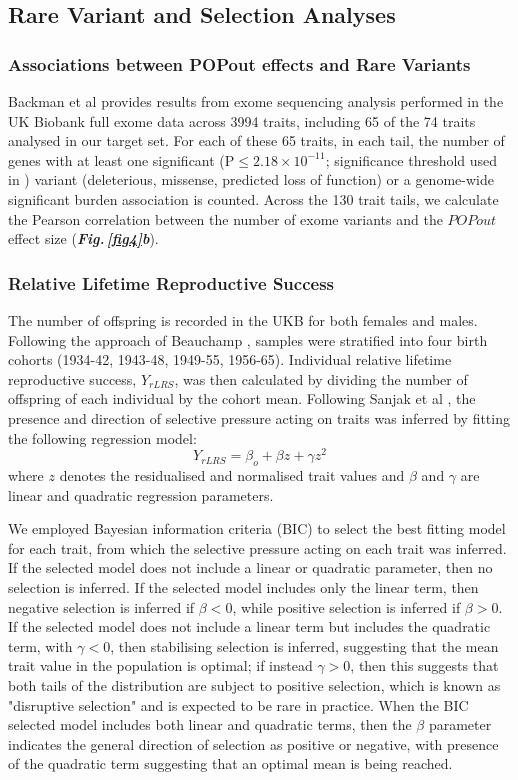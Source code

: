 \documentclass[12pt]{zHenriquesLab-StyleBioRxiv}
\newcommand\dref[2]{\normalsize{\textbf{\textit{Fig.\,\ref{#1}#2}}}\normalsize{}}
\begin{document}
\subsection*{Rare Variant and Selection Analyses} \label{sec:methods:rvs} 

\subsubsection*{Associations between POPout effects and Rare Variants}
Backman et al \cite{backman} provides results from exome sequencing analysis 
performed in the UK Biobank full exome data across 3994 traits, including 65 of 
the 74 traits analysed in our target set. For each of these 65 traits, in each tail, 
the number of genes with at least one significant (P$\le 2.18\times 10^{-11}$; significance 
threshold used in \cite{backman}) variant (deleterious, missense, predicted loss of function) or a 
genome-wide significant burden association is counted. Across the 130 trait tails, we 
calculate the Pearson correlation between the number of exome variants and the $POPout$ 
effect size (\dref{fig4}{b}). 
%
\subsubsection*{Relative Lifetime Reproductive Success}
The number of offspring is recorded in the UKB for both females and
males. Following the approach of Beauchamp \citep{v_select2}, samples were 
stratified into four birth cohorts (1934-42, 1943-48, 1949-55, 1956-65). Individual relative
lifetime reproductive success, $Y_{rLRS}$, was then calculated by
dividing the number of offspring of each individual by the cohort
mean. Following Sanjak et al \citep{v_select}, the presence and
direction of selective pressure acting on traits was inferred by
fitting the following regression model:
\begin{equation}
Y_{rLRS} = \beta_o + \beta z + \gamma z^2 \label{math:LRS}
\end{equation}
where $z$ denotes the residualised and normalised trait values and
$\beta$ and $\gamma$ are linear and quadratic regression parameters.

We employed Bayesian information criteria (BIC) to select the best
fitting model for each trait, from which the selective pressure acting
on each trait was inferred. If the selected model does not include a linear
or quadratic parameter, then no selection is inferred. If the selected model
includes only the linear term, then negative selection is inferred if $\beta<0$, 
while positive selection is inferred if $\beta>0$. If the selected model does not 
include a linear term but includes the quadratic term, with $\gamma<0$, then 
stabilising selection is inferred, suggesting that the mean trait value in the 
population is optimal; if instead $\gamma>0$, then this suggests that 
both tails of the distribution are subject to positive selection, which is known as 
"disruptive selection" and is expected to be rare in practice. When the BIC selected 
model includes both linear and quadratic terms, then the $\beta$ parameter indicates 
the general direction of selection as positive or negative, with presence of the quadratic 
term suggesting that an optimal mean is being reached.
%
\end{document}

